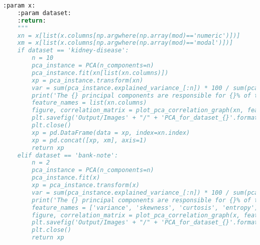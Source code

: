 \documentclass[11pt,a4paper]{article}
\begin{document}
\begin{lstlisting}[language=Python,basicstyle=\tiny]
    :param x:
    :param dataset:
    :return:
    """
    xn = x[list(x.columns[np.argwhere(np.array(mod)=='numeric')])]
    xm = x[list(x.columns[np.argwhere(np.array(mod)=='modal')])]
    if dataset == 'kidney-disease':
        n = 10
        pca_instance = PCA(n_components=n)
        pca_instance.fit(xn[list(xn.columns)])
        xp = pca_instance.transform(xn)
        var = sum(pca_instance.explained_variance_[:n]) * 100 / sum(pca_instance.explained_variance_)
        print('The {} principal components are responsible for {}% of the variance'.format(n, var))
        feature_names = list(xn.columns)
        figure, correlation_matrix = plot_pca_correlation_graph(xn, feature_names, figure_axis_size=10)
        plt.savefig('Output/Images' + "/" + 'PCA_for_dataset_{}'.format(dataset))
        plt.close()
        xp = pd.DataFrame(data = xp, index=xn.index)
        xp = pd.concat([xp, xm], axis=1)
        return xp
    elif dataset == 'bank-note':
        n = 2
        pca_instance = PCA(n_components=n)
        pca_instance.fit(x)
        xp = pca_instance.transform(x)
        var = sum(pca_instance.explained_variance_[:n]) * 100 / sum(pca_instance.explained_variance_)
        print('The {} principal components are responsible for {}% of the variance'.format(n, var))
        feature_names = ['variance', 'skewness', 'curtosis', 'entropy']
        figure, correlation_matrix = plot_pca_correlation_graph(x, feature_names, figure_axis_size=10)
        plt.savefig('Output/Images' + "/" + 'PCA_for_dataset_{}'.format(dataset))
        plt.close()
        return xp

\end{lstlisting}
\end{document}
